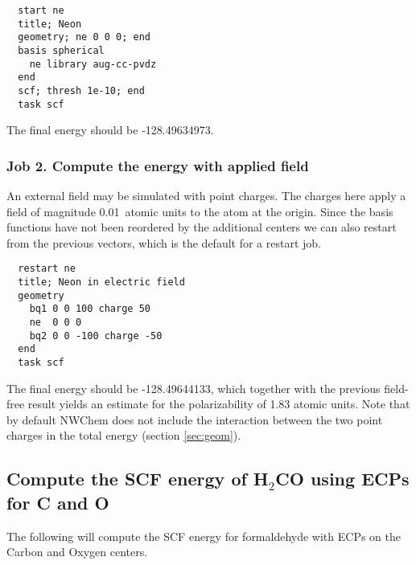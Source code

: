 \begin{verbatim}
  start ne
  title; Neon
  geometry; ne 0 0 0; end
  basis spherical 
    ne library aug-cc-pvdz
  end
  scf; thresh 1e-10; end
  task scf
\end{verbatim}

The final energy should be -128.49634973.

\subsubsection{Job 2. Compute the energy with applied field}

An external field may be simulated with point charges.  The charges
here apply a field of magnitude 0.01\ atomic units to the atom at the
origin.  Since the basis functions have not been reordered by the
additional centers we can also restart from the previous vectors,
which is the default for a restart job.

\begin{verbatim}
  restart ne
  title; Neon in electric field
  geometry
    bq1 0 0 100 charge 50
    ne  0 0 0
    bq2 0 0 -100 charge -50
  end
  task scf
\end{verbatim}

The final energy should be -128.49644133, which together with the
previous field-free result yields an estimate for the polarizability
of 1.83 atomic units.  Note that by default NWChem does not include
the interaction between the two point charges in the total energy
(section \ref{sec:geom}).

\subsection{Compute the SCF energy of H$_2$CO using ECPs for C and O}
\label{sec:sample3}

The following will compute the SCF energy for formaldehyde with ECPs
on the Carbon and Oxygen centers.

